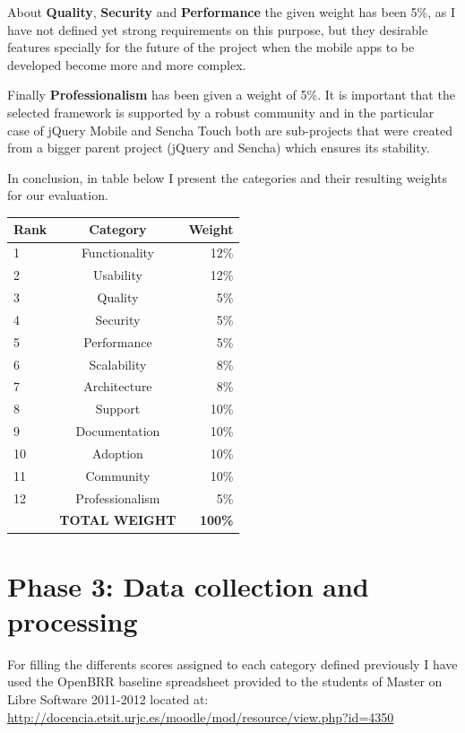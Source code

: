 \documentclass[a4paper,12pt]{book}
\begin{document}
About \textbf{Quality}, \textbf{Security} and \textbf{Performance} the given weight has been 5\%, as I have not defined yet strong requirements on this purpose, but they desirable features specially for the future of the project when the mobile apps to be developed become more and more complex.

Finally \textbf{Professionalism} has been given a weight of 5\%. It is important that the selected framework is supported by a robust community and in the particular case of jQuery Mobile and Sencha Touch both are sub-projects that were created from a bigger parent project (jQuery and Sencha) which ensures its stability. 

In conclusion, in table below I present the categories and
their resulting weights for our evaluation.

\begin{table}[ht]
\begin{center}
    \begin{tabular}{ | l | c | r |}
    \hline
    \textbf{Rank} & \textbf{Category} & \textbf{Weight} \\ \hline
    1 & Functionality & 12\% \\ \hline
    2 & Usability & 12\% \\ \hline
    3 & Quality & 5\% \\ \hline
    4 & Security & 5\% \\ \hline
    5 & Performance & 5\% \\ \hline
    6 & Scalability & 8\% \\ \hline
    7 & Architecture & 8\% \\ \hline
    8 & Support & 10\% \\ \hline
    9 & Documentation & 10\% \\ \hline
    10 & Adoption & 10\% \\ \hline
    11 & Community & 10\% \\ \hline
    12 & Professionalism & 5\% \\ \hline
     & \textbf{TOTAL WEIGHT} & \textbf{100\%} \\ \hline  
    \end{tabular}
\end{center}
\label{OpenBRR2}
\end{table}

\section{Phase 3: Data collection and processing}
\label{sec:phase3}
For filling the differents scores assigned to each category defined previously I have used the OpenBRR baseline spreadsheet provided to the students of Master on Libre Software 2011-2012 located at:\\
\url{http://docencia.etsit.urjc.es/moodle/mod/resource/view.php?id=4350}
\end{document}
